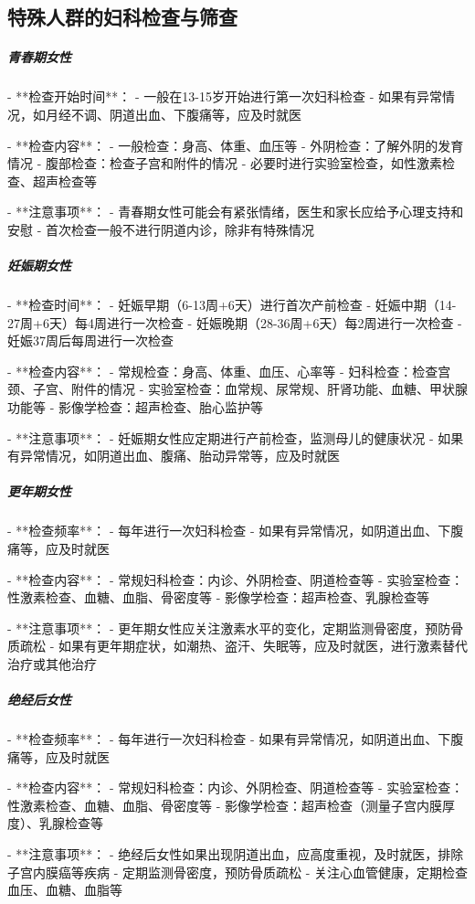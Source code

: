 \begin{enumerate}
\subsection{特殊人群的妇科检查与筛查}

\subparagraph{青春期女性}

- **检查开始时间**：
  - 一般在13-15岁开始进行第一次妇科检查
  - 如果有异常情况，如月经不调、阴道出血、下腹痛等，应及时就医

- **检查内容**：
  - 一般检查：身高、体重、血压等
  - 外阴检查：了解外阴的发育情况
  - 腹部检查：检查子宫和附件的情况
  - 必要时进行实验室检查，如性激素检查、超声检查等

- **注意事项**：
  - 青春期女性可能会有紧张情绪，医生和家长应给予心理支持和安慰
  - 首次检查一般不进行阴道内诊，除非有特殊情况

\subparagraph{妊娠期女性}

- **检查时间**：
  - 妊娠早期（6-13周+6天）进行首次产前检查
  - 妊娠中期（14-27周+6天）每4周进行一次检查
  - 妊娠晚期（28-36周+6天）每2周进行一次检查
  - 妊娠37周后每周进行一次检查

- **检查内容**：
  - 常规检查：身高、体重、血压、心率等
  - 妇科检查：检查宫颈、子宫、附件的情况
  - 实验室检查：血常规、尿常规、肝肾功能、血糖、甲状腺功能等
  - 影像学检查：超声检查、胎心监护等

- **注意事项**：
  - 妊娠期女性应定期进行产前检查，监测母儿的健康状况
  - 如果有异常情况，如阴道出血、腹痛、胎动异常等，应及时就医

\subparagraph{更年期女性}

- **检查频率**：
  - 每年进行一次妇科检查
  - 如果有异常情况，如阴道出血、下腹痛等，应及时就医

- **检查内容**：
  - 常规妇科检查：内诊、外阴检查、阴道检查等
  - 实验室检查：性激素检查、血糖、血脂、骨密度等
  - 影像学检查：超声检查、乳腺检查等

- **注意事项**：
  - 更年期女性应关注激素水平的变化，定期监测骨密度，预防骨质疏松
  - 如果有更年期症状，如潮热、盗汗、失眠等，应及时就医，进行激素替代治疗或其他治疗

\subparagraph{绝经后女性}

- **检查频率**：
  - 每年进行一次妇科检查
  - 如果有异常情况，如阴道出血、下腹痛等，应及时就医

- **检查内容**：
  - 常规妇科检查：内诊、外阴检查、阴道检查等
  - 实验室检查：性激素检查、血糖、血脂、骨密度等
  - 影像学检查：超声检查（测量子宫内膜厚度）、乳腺检查等

- **注意事项**：
  - 绝经后女性如果出现阴道出血，应高度重视，及时就医，排除子宫内膜癌等疾病
  - 定期监测骨密度，预防骨质疏松
  - 关注心血管健康，定期检查血压、血糖、血脂等


\end{enumerate}
